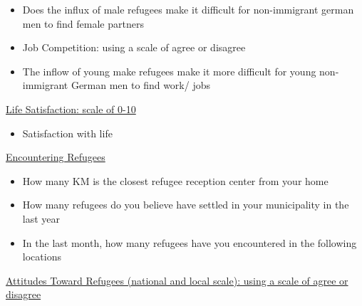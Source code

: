 \documentclass[
]{article}
\providecommand{\tightlist}{%
  \setlength{\itemsep}{0pt}\setlength{\parskip}{0pt}}\usepackage{longtable,booktabs,array}
\begin{document}
\begin{itemize}
\tightlist
\item
  Does the influx of male refugees make it difficult for non-immigrant
  german men to find female partners
\item
  Job Competition: using a scale of agree or disagree
\item
  The inflow of young make refugees make it more difficult for young
  non-immigrant German men to find work/ jobs
\end{itemize}

\uline{Life Satisfaction: scale of 0-10}

\begin{itemize}
\tightlist
\item
  Satisfaction with life
\end{itemize}

\uline{Encountering Refugees}

\begin{itemize}
\item
  How many KM is the closest refugee reception center from your home
\item
  How many refugees do you believe have settled in your municipality in
  the last year
\item
  In the last month, how many refugees have you encountered in the
  following locations
\end{itemize}

\uline{Attitudes Toward Refugees (national and local scale): using a
scale of agree or disagree}
\end{document}
